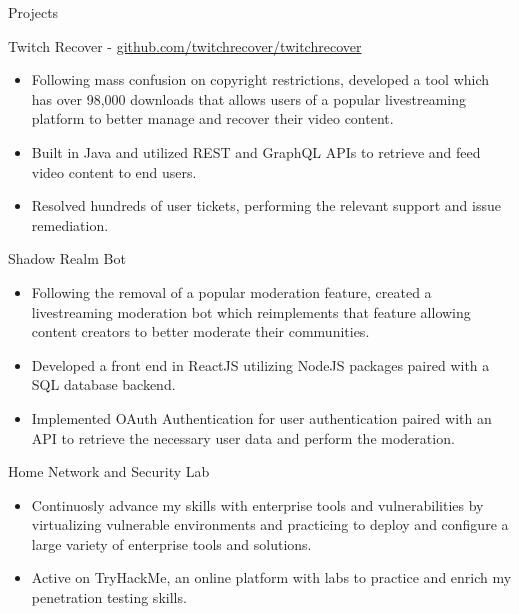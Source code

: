 \documentclass{article}
\newlength{\tabin}
\newlength{\secsep}
\newcommand{\lineunder}{\vspace*{-8pt} \\ \hspace*{-6pt} \hrulefill \\ \vspace*{-15pt}}
\newenvironment{tabbedsection}[1]{
  \begin{list}{}{
      \setlength{\itemsep}{0pt}
      \setlength{\labelsep}{0pt}
      \setlength{\labelwidth}{0pt}
      \setlength{\leftmargin}{\tabin}
      \setlength{\rightmargin}{\tabin}
      \setlength{\listparindent}{0pt}
      \setlength{\parsep}{0pt}
      \setlength{\parskip}{0pt}
      \setlength{\partopsep}{0pt}
      \setlength{\topsep}{#1}
    }
  \item[]
}{\end{list}}
\newenvironment{resume_section}[1]{
  \filbreak
  \vspace{2\secsep}
  \textsc{\color{blue}\large#1}
  \lineunder
  \begin{tabbedsection}{\secsep}
}{\end{tabbedsection}}
\newenvironment{resume_subsection}[2][]{
  \textbf{\color{BlueViolet}#2} \hfill {\normalsize #1} \hspace{-5em} 
  \begin{tabbedsection}{0.5\secsep}
}{\end{tabbedsection}}
\newenvironment{subitems}{
  \renewcommand{\labelitemi}{-}
  \begin{itemize}
      \setlength{\labelsep}{1em}
}{\end{itemize}}
\begin{document}
\begin{resume_section}{Projects}
\begin{resume_subsection}{Twitch Recover - \faGithub \hspace{0.01cm} \href{https://github.com/twitchrecover/twitchrecover}{github.com/twitchrecover/twitchrecover}}
\begin{subitems}
                \item Following mass confusion on copyright restrictions, developed a tool which has over 98,000 downloads that allows users of a popular livestreaming platform to better manage and recover their video content.
    			\item Built in Java and utilized REST and GraphQL APIs to retrieve and feed video content to end users.
    			\item Resolved hundreds of user tickets, performing the relevant support and issue remediation.
		\end{subitems}
	\end{resume_subsection}
	\vspace{2\secsep}
	\begin{resume_subsection}{Shadow Realm Bot}
		\begin{subitems}
            \item Following the removal of a popular moderation feature, created a livestreaming moderation bot which reimplements that feature allowing content creators to better moderate their communities. 
			\item Developed a front end in ReactJS utilizing NodeJS packages paired with a SQL database backend.
			\item Implemented OAuth Authentication for user authentication paired with an API to retrieve the necessary user data and perform the moderation.
		\end{subitems}
	\end{resume_subsection}
	\vspace{2\secsep}
  	\begin{resume_subsection}{Home Network and Security Lab}
  		\begin{subitems}
            \item Continuosly advance my skills with enterprise tools and vulnerabilities by virtualizing vulnerable environments and practicing to deploy and configure a large variety of enterprise tools and solutions. 
  			\item Active on TryHackMe, an online platform with labs to practice and enrich my penetration testing skills.
  		\end{subitems}
  	\end{resume_subsection}
\end{resume_section}

\vspace{2\secsep}
\end{document}
